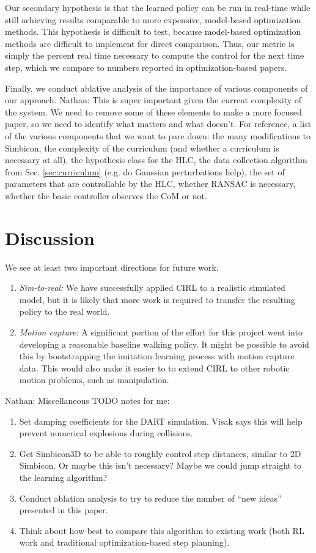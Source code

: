 \documentclass[a4paper]{article}
\newcommand{\nhatch}[1]{{\leavevmode\color{blue} Nathan: #1}}
\begin{document}
Our secondary hypothesis is that the learned policy can be run in real-time while still achieving results comparable to more expensive, model-based optimization methods.
This hypothesis is difficult to test, because model-based optimization methods are difficult to implement for direct comparison.
Thus, our metric is simply the percent real time necessary to compute the control for the next time step, which we compare to numbers reported in optimization-based papers.

Finally, we conduct ablative analysis of the importance of various components of our approach.
\nhatch{This is super important given the current complexity of the system. We need to remove some of these elements to make a more focused paper, so we need to identify what matters and what doesn't.
For reference, a list of the various components that we want to pare down: the many modifications to Simbicon, the complexity of the curriculum (and whether a curriculum is necessary at all), the hypothesis class for the HLC, the data collection algorithm from Sec. \ref{sec:curriculum} (e.g. do Gaussian perturbations help), the set of parameters that are controllable by the HLC, whether RANSAC is necessary, whether the basic controller observes the CoM or not.}

\section{Discussion}

We see at least two important directions for future work.
\begin{enumerate}
  \item \emph{Sim-to-real:}
    We have successfully applied CIRL to a realistic simulated model, but it is likely that more work is required to transfer the resulting policy to the real world.
  \item \emph{Motion capture:}
    A significant portion of the effort for this project went into developing a reasonable baseline walking policy.
    It might be possible to avoid this by bootstrapping the imitation learning process with motion capture data.
    This would also make it easier to to extend CIRL to other robotic motion problems, such as manipulation.
\end{enumerate}

\nhatch{Miscellaneous TODO notes for me:
\begin{enumerate}
  \item Set damping coefficients for the DART simulation. Visak says this will help prevent numerical explosions during collisions.
  \item Get Simbicon3D to be able to roughly control step distances, similar to 2D Simbicon. Or maybe this isn't necessary? Maybe we could jump straight to the learning algorithm?
  \item Conduct ablation analysis to try to reduce the number of ``new ideas'' presented in this paper.
  \item Think about how best to compare this algorithm to existing work (both RL work and traditional optimization-based step planning).
\end{enumerate}
}



\end{document}
